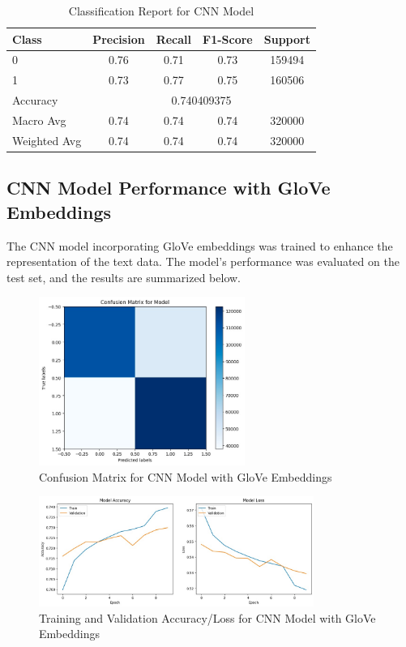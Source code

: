 \documentclass[12pt]{article}
\begin{document}
\begin{table}[H]
    \centering
    \begin{tabular}{lcccc}
    \hline
    Class & Precision & Recall & F1-Score & Support \\
    \hline
    0 & 0.76 & 0.71 & 0.73 & 159494 \\
    1 & 0.73 & 0.77 & 0.75 & 160506 \\
    \hline
    Accuracy & \multicolumn{4}{c}{0.740409375} \\
    Macro Avg & 0.74 & 0.74 & 0.74 & 320000 \\
    Weighted Avg & 0.74 & 0.74 & 0.74 & 320000 \\
    \hline
    \end{tabular}
    \caption{Classification Report for CNN Model}
    \label{tab:cnn_classification_report}
\end{table}

\subsection{CNN Model Performance with GloVe Embeddings}
The CNN model incorporating GloVe embeddings was trained to enhance the representation of the text data. The model's performance was evaluated on the test set, and the results are summarized below.

\begin{figure}[H]
    \centering
    \includegraphics[width=0.6\textwidth]{WhatsApp Image 2024-05-29 at 02.38.06 (1).jpeg}
    \caption{Confusion Matrix for CNN Model with GloVe Embeddings}
    \label{fig:cnn_glove_confusion_matrix}
\end{figure}

\begin{figure}[H]
    \centering
    \includegraphics[width=0.8\textwidth]{WhatsApp Image 2024-05-29 at 02.38.06.jpeg}
    \caption{Training and Validation Accuracy/Loss for CNN Model with GloVe Embeddings}
    \label{fig:cnn_glove_training_validation}
\end{figure}
\end{document}
